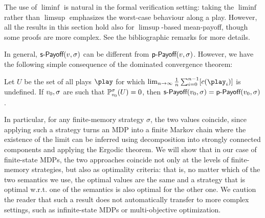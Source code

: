 The use of $ \liminf $ is natural in the formal verification setting: taking the $\liminf$ rather than $ \limsup $ emphasizes the worst-case behaviour along a play. However, all the results in this section hold also for $\limsup$-based mean-payoff, though some proofs are more complex. See the bibliographic remarks for more details.
%

In general, $\textsf{s-Payoff}(v,\sigma)$ can be different from $ \textsf{p-Payoff}(v, \sigma) $. However, we have the following simple consequence of the dominated convergence theorem:
\begin{lemma}
	\label{5-lem:limit-defined}
Let $U$ be the set of all plays $\play$  for which $\lim_{n\rightarrow \infty} \frac{1}{n} \sum_{i=0}^{n-1}[\colouring(\play_i)]$ is undefined. If $v_0,\sigma$ are such that $\mathbb{P}^\sigma_{v_0}(U) = 0$, then $\textsf{s-Payoff}(v_0,\sigma) = \textsf{p-Payoff}(v_0, \sigma) $.
\end{lemma}


In particular, for any finite-memory strategy $ \sigma $, the two values coincide, since applying such a strategy turns an MDP into a finite Markov chain where the existence of the limit can be inferred using decomposition into strongly connected components and applying the Ergodic theorem.
We will show that in our case of finite-state MDPs, the two approaches coincide not only at the levels of finite-memory strategies, but also as optimality criteria: that is, no matter which of the two semantics we use, the optimal values are the same and a strategy that is optimal w.r.t. one of the semantics is also optimal for the other one. We caution the reader that such a result does not automatically transfer to more complex settings, such as infinite-state MDPs or multi-objective optimization. 

